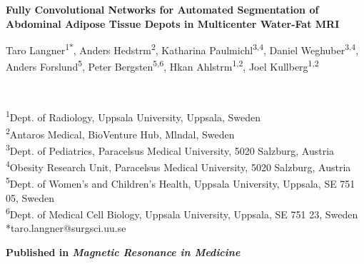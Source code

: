 \documentclass[10pt,letterpaper]{article}
\begin{document}
	\begin{center}
		\textbf{\Large
			Fully Convolutional Networks for Automated Segmentation of Abdominal Adipose Tissue Depots in Multicenter Water-Fat MRI}\\
		\vspace{0.5cm}
		\begin{large}
			Taro Langner\textsuperscript{1*},
			Anders Hedstrm\textsuperscript{2},
			Katharina Paulmichl\textsuperscript{3,4},
			Daniel Weghuber\textsuperscript{3,4},\\
			Anders Forslund\textsuperscript{5},
			Peter Bergsten\textsuperscript{5,6},
			Hkan Ahlstrm\textsuperscript{1,2},
			Joel Kullberg\textsuperscript{1,2}
		\end{large}
		\\
		\bigskip
	\end{center}


	\textsuperscript{1}Dept. of Radiology, Uppsala University, Uppsala, Sweden
	\\
	\textsuperscript{2}Antaros Medical, BioVenture Hub, Mlndal, Sweden
	\\
	\textsuperscript{3}Dept. of Pediatrics, Paracelsus Medical University, 5020 Salzburg, Austria
	\\
	\textsuperscript{4}Obesity Research Unit, Paracelsus Medical University, 5020 Salzburg, Austria
	\\
	\textsuperscript{5}Dept. of Women’s and Children’s Health, Uppsala University, Uppsala, SE 751 05, Sweden
	\\
	\textsuperscript{6}Dept. of Medical Cell Biology, Uppsala University, Uppsala, SE 751 23, Sweden
	\\


	\bigskip
	*taro.langner@surgsci.uu.se


	\bigskip
	\textbf{Published in \textit{Magnetic Resonance in Medicine}}
	\bigskip
\end{document}
